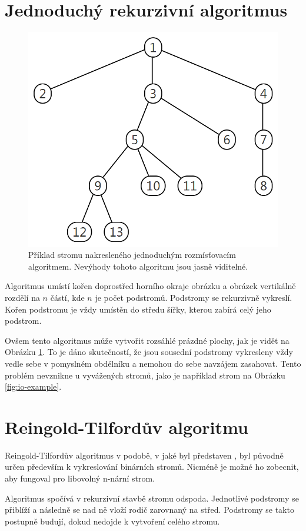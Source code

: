 \documentclass[12pt, a4paper]{report}
\begin{document}
\section{Jednoduchý rekurzivní algoritmus}
\label{sec:simple-layout}
\begin{figure}
	\centering
	\includegraphics[height=0.5\linewidth]{img-simple-layout}
	\caption{Příklad stromu nakresleného jednoduchým rozmísťovacím algoritmem. Nevýhody tohoto algoritmu jsou jasně viditelné.}
	\label{fig:simple-layout}
\end{figure}

Algoritmus umístí kořen doprostřed horního okraje obrázku a obrázek vertikálně rozdělí na $n$ částí, kde $n$ je počet podstromů. Podstromy se rekurzivně vykreslí. Kořen podstromu je vždy umístěn do středu šířky, kterou zabírá celý jeho podstrom.

Ovšem tento algoritmus může vytvořit rozsáhlé prázdné plochy, jak je vidět na Obrázku \ref{fig:simple-layout}. To je dáno skutečností, že jsou sousední podstromy vykresleny vždy vedle sebe v pomyslném obdélníku a nemohou do sebe navzájem zasahovat. Tento problém nevznikne u vyvážených stromů, jako je například strom na Obrázku \ref{fig:io-example}.

\section{Reingold-Tilfordův algoritmu}
Reingold-Tilfordův algoritmus v podobě, v jaké byl představen \cite{reingold_tilford}, byl původně určen především k vykreslování binárních stromů. Nicméně je možné ho zobecnit, aby fungoval pro libovolný n-nární strom. 

Algoritmus spočívá v rekurzivní stavbě stromu odspoda. Jednotlivé podstromy se přiblíží a následně se nad ně vloží rodič zarovnaný na střed. Podstromy se takto postupně budují, dokud nedojde k vytvoření celého stromu.
\end{document}

